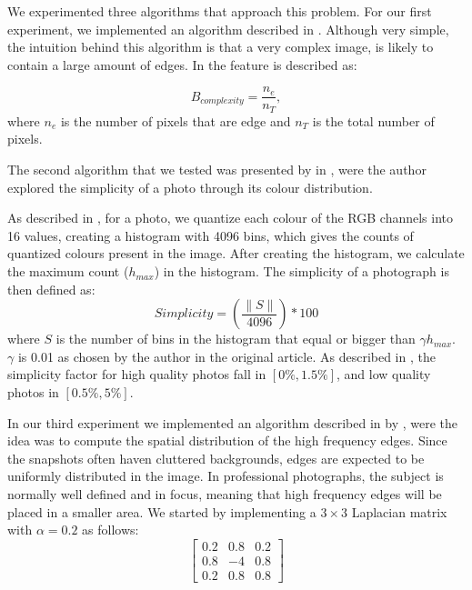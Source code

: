 We experimented three algorithms that approach this problem. For our first experiment, we implemented an algorithm described in \cite{kaoautomatic}. Although very simple, the intuition behind this algorithm is that a very complex image, is likely to contain a large amount of edges. In \cite{kaoautomatic} the feature is described as:

\begin{equation}
	B_{complexity} = \frac{n_{e}}{n_{T}},
\end{equation}
where $n_{e}$ is the number of pixels that are edge and $n_{T}$ is the total number of pixels.
 
 
The second algorithm that we tested was presented by \citeauthor{luo2008photo} in \cite{luo2008photo}, were the author explored the simplicity of a photo through its colour distribution.

As described in \cite{luo2008photo}, for a photo, we quantize each colour of the RGB channels into 16 values, creating a histogram with 4096 bins, which gives the counts of quantized colours present in the image. After creating the histogram, we calculate the maximum count ($h_{max}$) in the histogram. The simplicity of a photograph is then defined as:
\begin{equation}
	Simplicity = \left(\frac{\|S\|}{4096}\right) * 100%
\end{equation}
where $S$ is the number of bins in the histogram that equal or bigger than $\gamma h_{max}$. $\gamma$ is 0.01 as chosen by the author in the original article. As described in \cite{luo2008photo}, the simplicity factor for high quality photos fall in $[0\%,1.5\%]$, and low quality photos in $[0.5\%,5\%]$.

In our third experiment we implemented an algorithm described in \cite{ke2006design} by \citeauthor{ke2006design}, were the idea was to compute the spatial distribution of the high frequency edges. Since the snapshots often haven cluttered backgrounds, edges are expected to be uniformly distributed in the image. In professional photographs, the subject is normally well defined and in focus, meaning that high frequency edges will be placed in a smaller area.
We started by implementing a $3\times3$ Laplacian matrix with $\alpha = 0.2$ as follows:
\begin{equation}
\begin{bmatrix}
  0.2 & 0.8 & 0.2 \\
  0.8 & -4 & 0.8 \\
  0.2 & 0.8 & 0.8
\end{bmatrix}
\end{equation}

